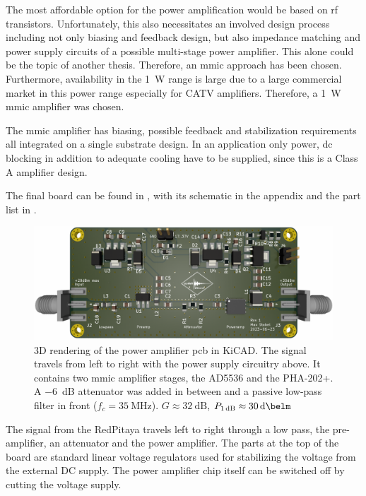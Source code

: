 The most affordable option for the power amplification would be based on \acrshort{rf} transistors. Unfortunately, this also necessitates an involved design process including not only biasing and feedback design, but also impedance matching and power supply circuits of a possible multi-stage power amplifier. This alone could be the topic of another thesis. Therefore, an \acrshort{mmic} approach has been chosen. Furthermore, availability in the \qty{1}{\watt} range is large due to a large commercial market in this power range especially for CATV amplifiers. Therefore, a \qty{1}{\watt} \acrshort{mmic} amplifier was chosen.

The \acrfull{mmic} amplifier has biasing, possible feedback and stabilization requirements all integrated on a single substrate design. In an application only power, \acrshort{dc} blocking in addition to adequate cooling have to be supplied, since this is a Class A amplifier design.

The final board can be found in , with its schematic in the appendix  and the part list in .

\begin{figure}[hbt]
    \centering
    \includegraphics{images/poweramp.png}
    \caption{ 3D rendering of the power amplifier \acrshort{pcb} in KiCAD. The signal travels from left to right with the power supply circuitry above. It contains two \acrshort{mmic} amplifier stages, the AD5536 and the PHA-202+. A \qty{-6}{\deci\bel} attenuator was added in between and a passive low-pass filter in front (\(f_c = \qty{35}{\mega\hertz}\)). \(G \approx \qty{32}{\deci\bel}\), \(P_{\qty{1}{\deci\bel}} \approx \qty{+30}{\deci\belm}\)}
\end{figure}

The signal from the RedPitaya travels left to right through a low pass, the pre-amplifier, an attenuator and the power amplifier. The parts at the top of the board are standard linear voltage regulators used for stabilizing the voltage from the external DC supply. The power amplifier chip itself can be switched off by cutting the voltage supply.

